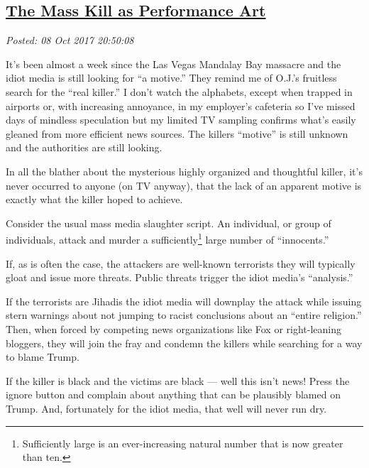 %

\subsection*{\href{https://analyzethedatanotthedrivel.org/2017/10/08/the-mass-kill-as-performance-art/}{The Mass Kill as Performance Art}}


\noindent\emph{Posted: 08 Oct 2017 20:50:08}
\vspace{6pt}

It's been almost a week since the Las Vegas Mandalay Bay massacre and
the idiot media is still looking for ``a motive.'' They remind me of
O.J.'s fruitless search for the ``real killer.'' I don't watch the
alphabets, except when trapped in airports or, with increasing
annoyance, in my employer's cafeteria so I've missed days of mindless
speculation but my limited TV sampling confirms what's easily gleaned
from more efficient news sources. The killers ``motive'' is still
unknown and the authorities are still looking.

In all the blather about the mysterious highly organized and thoughtful
killer, it's never occurred to anyone (on TV anyway), that the lack of
an apparent motive is exactly what the killer hoped to achieve.

Consider the usual mass media slaughter script. An individual, or group
of individuals, attack and murder a
sufficiently\footnote{Sufficiently large is an ever-increasing natural number that is now
  greater than ten.} large number of ``innocents.''

If, as is often the case, the attackers are well-known terrorists they
will typically gloat and issue more threats. Public threats trigger the
idiot media's ``analysis.''

If the terrorists are Jihadis the idiot media will downplay the attack
while issuing stern warnings about not jumping to racist conclusions
about an ``entire religion.'' Then, when forced by competing news
organizations like Fox or right-leaning bloggers, they will join the
fray and condemn the killers while searching for a way to blame Trump.

If the killer is black and the victims are black --- well this isn't
news! Press the ignore button and complain about anything that can be
plausibly blamed on Trump. And, fortunately for the idiot media, that
well will never run dry.

